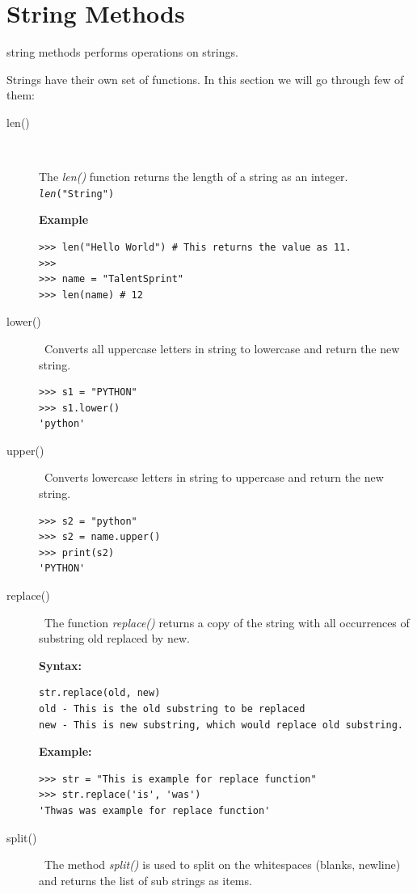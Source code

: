 \documentclass[11pt,a4paper]{article}
\begin{document}
\section*{String Methods}
string methods performs operations on strings.

Strings have their own set of functions. In this section we will go through few of them:

\begin{description}
\item[len()]\

The \emph{len()} function returns the length of a string as an integer.
\texttt{\emph{len}("String")}

\textbf{Example}\\
\begin{verbatim}
>>> len("Hello World") # This returns the value as 11.
>>>
>>> name = "TalentSprint" 
>>> len(name) # 12
\end{verbatim}

\item[lower()]\
Converts all uppercase letters in string to lowercase and return the new string.
\begin{verbatim}
>>> s1 = "PYTHON"
>>> s1.lower()
'python'
\end{verbatim}

\item[upper()]\
Converts lowercase letters in string to uppercase and return the new string.
\begin{verbatim}
>>> s2 = "python"
>>> s2 = name.upper()
>>> print(s2)
'PYTHON'
\end{verbatim}

\item[replace()]\
The function \emph{replace()} returns a copy of the string with all occurrences of substring old replaced by new.

\textbf{Syntax:}
\begin{verbatim}
str.replace(old, new)
old - This is the old substring to be replaced
new - This is new substring, which would replace old substring.
\end{verbatim}
\textbf{Example:}
\begin{verbatim}
>>> str = "This is example for replace function"
>>> str.replace('is', 'was')
'Thwas was example for replace function' 
\end{verbatim}

\item[split()]\
The method \emph{split()} is used to split on the whitespaces (blanks, newline) and returns the list of sub strings as items.


\end{description}
\end{document}
